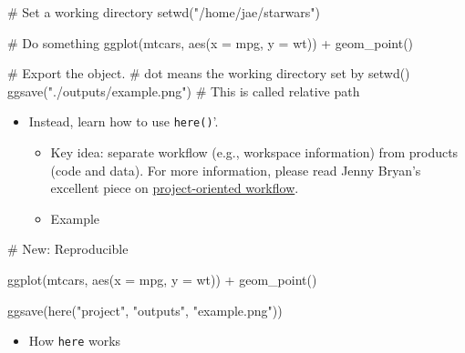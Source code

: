 \documentclass[
  letterpaper,
  DIV=11,
  numbers=noendperiod]{scrreprt}
\newenvironment{Shaded}{\begin{snugshade}}{\end{snugshade}}
\newcommand{\AttributeTok}[1]{\textcolor[rgb]{0.40,0.45,0.13}{#1}}
\newcommand{\CommentTok}[1]{\textcolor[rgb]{0.37,0.37,0.37}{#1}}
\newcommand{\FunctionTok}[1]{\textcolor[rgb]{0.28,0.35,0.67}{#1}}
\newcommand{\NormalTok}[1]{\textcolor[rgb]{0.00,0.23,0.31}{#1}}
\newcommand{\SpecialCharTok}[1]{\textcolor[rgb]{0.37,0.37,0.37}{#1}}
\newcommand{\StringTok}[1]{\textcolor[rgb]{0.13,0.47,0.30}{#1}}
\providecommand{\tightlist}{%
  \setlength{\itemsep}{0pt}\setlength{\parskip}{0pt}}\usepackage{longtable,booktabs,array}
\begin{document}
\begin{Shaded}
\begin{Highlighting}[]
\CommentTok{\# Set a working directory }
\FunctionTok{setwd}\NormalTok{(}\StringTok{"/home/jae/starwars"}\NormalTok{)}

\CommentTok{\# Do something }
\FunctionTok{ggplot}\NormalTok{(mtcars, }\FunctionTok{aes}\NormalTok{(}\AttributeTok{x =}\NormalTok{ mpg, }\AttributeTok{y =}\NormalTok{ wt)) }\SpecialCharTok{+}
   \FunctionTok{geom\_point}\NormalTok{()}

\CommentTok{\# Export the object. }
\CommentTok{\# dot means the working directory set by setwd()}
\FunctionTok{ggsave}\NormalTok{(}\StringTok{"./outputs/example.png"}\NormalTok{) }\CommentTok{\# This is called relative path }
\end{Highlighting}
\end{Shaded}

\begin{itemize}
\item
  Instead, learn how to use \texttt{here()}'.

  \begin{itemize}
  \item
    Key idea: separate workflow (e.g., workspace information) from
    products (code and data). For more information, please read Jenny
    Bryan's excellent piece on
    \href{https://www.tidyverse.org/blog/2017/12/workflow-vs-script/}{project-oriented
    workflow}.
  \item
    Example
  \end{itemize}
\end{itemize}

\begin{Shaded}
\begin{Highlighting}[]
\CommentTok{\# New: Reproducible }

\FunctionTok{ggplot}\NormalTok{(mtcars, }\FunctionTok{aes}\NormalTok{(}\AttributeTok{x =}\NormalTok{ mpg, }\AttributeTok{y =}\NormalTok{ wt)) }\SpecialCharTok{+}
   \FunctionTok{geom\_point}\NormalTok{()}

\FunctionTok{ggsave}\NormalTok{(}\FunctionTok{here}\NormalTok{(}\StringTok{"project"}\NormalTok{, }\StringTok{"outputs"}\NormalTok{, }\StringTok{"example.png"}\NormalTok{))}
\end{Highlighting}
\end{Shaded}

\begin{itemize}
\tightlist
\item
  How \texttt{here} works
\end{itemize}
\end{document}
